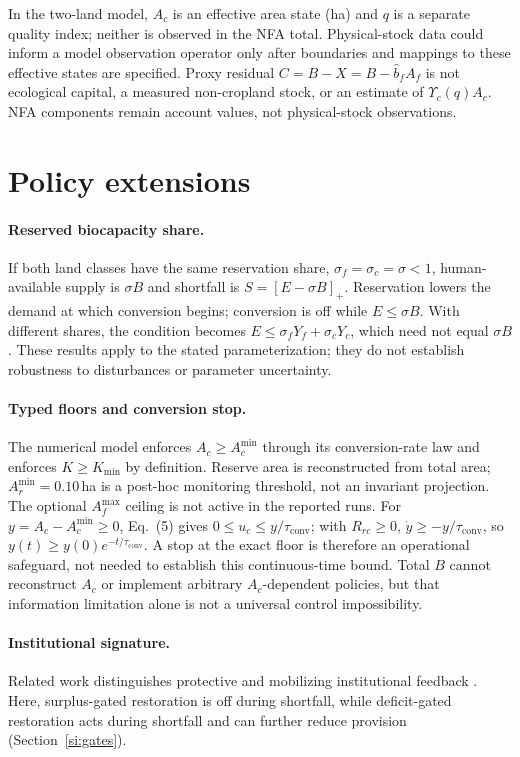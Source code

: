 \documentclass[11pt,a4paper]{article}
\newcommand{\Ups}{\Upsilon_c}
\newcommand{\Acmin}{A_c^{\min}}
\newcommand{\tconv}{\tau_{\mathrm{conv}}}
\begin{document}
In the two-land model, $A_c$ is an effective area state (ha) and $q$ is a separate quality index; neither is observed in the NFA total. Physical-stock data could inform a model observation operator only after boundaries and mappings to these effective states are specified. Proxy residual $C=B-X=B-\hat b_fA_f$ is not ecological capital, a measured non-cropland stock, or an estimate of $\Ups(q)A_c$. NFA components remain account values, not physical-stock observations.
\section{Policy extensions}\label{si:policy}

\paragraph{Reserved biocapacity share.} If both land classes have the same reservation share, $\sigma_f=\sigma_c=\sigma<1$, human-available supply is $\sigma B$ and shortfall is $S=[E-\sigma B]_+$. Reservation lowers the demand at which conversion begins; conversion is off while $E\le\sigma B$. With different shares, the condition becomes $E\le\sigma_fY_f+\sigma_cY_c$, which need not equal $\sigma B$. These results apply to the stated parameterization; they do not establish robustness to disturbances or parameter uncertainty.

\paragraph{Typed floors and conversion stop.} The numerical model enforces $A_c\ge\Acmin$ through its conversion-rate law and enforces $K\ge K_{\min}$ by definition. Reserve area is reconstructed from total area; $A_r^{\min}=0.10$\,ha is a post-hoc monitoring threshold, not an invariant projection. The optional $A_f^{\max}$ ceiling is not active in the reported runs. For $y=A_c-\Acmin\ge0$, Eq.~(5) gives $0\le u_c\le y/\tconv$; with $R_{rc}\ge0$, $\dot y\ge-y/\tconv$, so $y(t)\ge y(0)e^{-t/\tconv}$. A stop at the exact floor is therefore an operational safeguard, not needed to establish this continuous-time bound. Total $B$ cannot reconstruct $A_c$ or implement arbitrary $A_c$-dependent policies, but that information limitation alone is not a universal control impossibility.

\paragraph{Institutional signature.} Related work distinguishes protective and mobilizing institutional feedback \citep{Abaee2026a}. Here, surplus-gated restoration is off during shortfall, while deficit-gated restoration acts during shortfall and can further reduce provision (Section~\ref{si:gates}).
\end{document}
